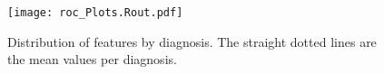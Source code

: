 \noindent\begin{figure}[H]
    \centering
    \texttt{[image: roc\_Plots.Rout.pdf]}\vspace{-0.3cm}
    \caption{\small{Distribution of features by diagnosis. The straight dotted lines are the mean values per diagnosis.}}\label{fig:roc}
\end{figure}

\newpage
%



